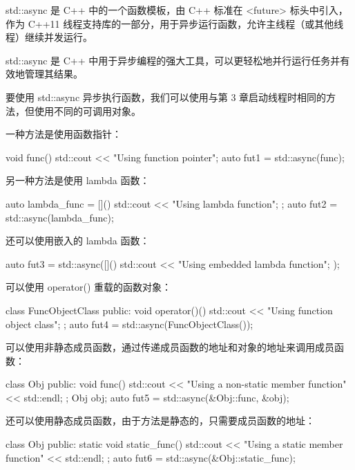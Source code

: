 
std::async 是 C++ 中的一个函数模板，由 C++ 标准在 <future> 标头中引入，作为 C++11 线程支持库的一部分，用于异步运行函数，允许主线程（或其他线程）继续并发运行。

 std::async 是 C++ 中用于异步编程的强大工具，可以更轻松地并行运行任务并有效地管理其结果。


要使用 std::async 异步执行函数，我们可以使用与第 3 章启动线程时相同的方法，但使用不同的可调用对象。

一种方法是使用函数指针：

\begin{cpp}
void func() {
    std::cout << "Using function pointer\n";
}
auto fut1 = std::async(func);
\end{cpp}

另一种方法是使用 lambda 函数：

\begin{cpp}
auto lambda_func = []() {
    std::cout << "Using lambda function\n";
};
auto fut2 = std::async(lambda_func);
\end{cpp}

还可以使用嵌入的 lambda 函数：

\begin{cpp}
auto fut3 = std::async([]() {
    std::cout << "Using embedded lambda function\n";
});
\end{cpp}

可以使用 operator() 重载的函数对象：

\begin{cpp}
class FuncObjectClass {
    public:
    void operator()() {
        std::cout << "Using function object class\n";
    }
};
auto fut4 = std::async(FuncObjectClass());
\end{cpp}

可以使用非静态成员函数，通过传递成员函数的地址和对象的地址来调用成员函数：

\begin{cpp}
class Obj {
    public:
    void func() {
        std::cout << "Using a non-static member function"
        << std::endl;
    }
};
Obj obj;
auto fut5 = std::async(&Obj::func, &obj);
\end{cpp}

还可以使用静态成员函数，由于方法是静态的，只需要成员函数的地址：

\begin{cpp}
class Obj {
    public:
    static void static_func() {
        std::cout << "Using a static member function"
        << std::endl;
    }
};
auto fut6 = std::async(&Obj::static_func);
\end{cpp}

